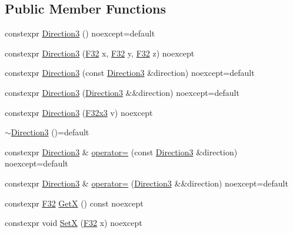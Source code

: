 \subsection*{Public Member Functions}
\begin{DoxyCompactItemize}
\item 
constexpr \mbox{\hyperlink{structmage_1_1_direction3_a64dd4745147f5fd39f710e8b9591074a}{Direction3}} () noexcept=default
\item 
constexpr \mbox{\hyperlink{structmage_1_1_direction3_a880d7413dc6f3742b53a089b870018c7}{Direction3}} (\mbox{\hyperlink{namespacemage_aa97e833b45f06d60a0a9c4fc22ae02c0}{F32}} x, \mbox{\hyperlink{namespacemage_aa97e833b45f06d60a0a9c4fc22ae02c0}{F32}} y, \mbox{\hyperlink{namespacemage_aa97e833b45f06d60a0a9c4fc22ae02c0}{F32}} z) noexcept
\item 
constexpr \mbox{\hyperlink{structmage_1_1_direction3_ad4d5801c6ad4949e0c7b0f4e2fec0ed9}{Direction3}} (const \mbox{\hyperlink{structmage_1_1_direction3}{Direction3}} \&direction) noexcept=default
\item 
constexpr \mbox{\hyperlink{structmage_1_1_direction3_aff1506b32f2b6dd49c2747eca90c76ce}{Direction3}} (\mbox{\hyperlink{structmage_1_1_direction3}{Direction3}} \&\&direction) noexcept=default
\item 
constexpr \mbox{\hyperlink{structmage_1_1_direction3_a9ef3fe2fd9fd55fade378d42eda597c3}{Direction3}} (\mbox{\hyperlink{namespacemage_a0fef5ab4e073c2d9ea876fefa3da4233}{F32x3}} v) noexcept
\item 
\mbox{\hyperlink{structmage_1_1_direction3_a583c087dc366d206aaf54a33bc90c50b}{$\sim$\+Direction3}} ()=default
\item 
constexpr \mbox{\hyperlink{structmage_1_1_direction3}{Direction3}} \& \mbox{\hyperlink{structmage_1_1_direction3_a500a363a93cded3e36a0704d288d34f3}{operator=}} (const \mbox{\hyperlink{structmage_1_1_direction3}{Direction3}} \&direction) noexcept=default
\item 
constexpr \mbox{\hyperlink{structmage_1_1_direction3}{Direction3}} \& \mbox{\hyperlink{structmage_1_1_direction3_a111a8f8d7286bfba0d7586925666315b}{operator=}} (\mbox{\hyperlink{structmage_1_1_direction3}{Direction3}} \&\&direction) noexcept=default
\item 
constexpr \mbox{\hyperlink{namespacemage_aa97e833b45f06d60a0a9c4fc22ae02c0}{F32}} \mbox{\hyperlink{structmage_1_1_direction3_a8d3ec6086f1b47844331950df3a47207}{GetX}} () const noexcept
\item 
constexpr void \mbox{\hyperlink{structmage_1_1_direction3_a0c2b501a6e30261d872227bb73be8914}{SetX}} (\mbox{\hyperlink{namespacemage_aa97e833b45f06d60a0a9c4fc22ae02c0}{F32}} x) noexcept

\end{DoxyCompactItemize}

